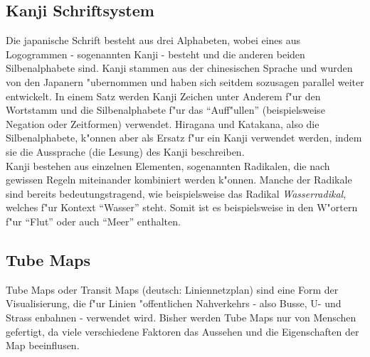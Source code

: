 \subsection{Kanji Schriftsystem}
Die japanische Schrift besteht aus drei Alphabeten, wobei eines aus Logogrammen - sogenannten Kanji - besteht und die anderen beiden Silbenalphabete sind. Kanji stammen aus der chinesischen Sprache und wurden von den Japanern "ubernommen und haben sich seitdem sozusagen parallel weiter entwickelt. In einem Satz werden Kanji Zeichen unter Anderem f"ur den Wortstamm und die Silbenalphabete f"ur das "`Auff"ullen"' (beispielsweise Negation oder Zeitformen) verwendet. Hiragana und Katakana, also die Silbenalphabete, k"onnen aber als Ersatz f"ur ein Kanji verwendet werden, indem sie die Aussprache (die Lesung) des Kanji beschreiben. \\
Kanji bestehen aus einzelnen Elementen, sogenannten Radikalen, die nach gewissen Regeln miteinander kombiniert werden k"onnen. Manche der Radikale sind bereits bedeutungstragend, wie beispielsweise das Radikal \emph{Wasserradikal}, welches f"ur Kontext "`Wasser"' steht. Somit ist es beispielsweise in den W"ortern f"ur "`Flut"' oder auch "`Meer"' enthalten. 

\subsection{Tube Maps}
Tube Maps oder Transit Maps (deutsch: Liniennetzplan) sind eine Form der Visualisierung, die f"ur Linien "offentlichen Nahverkehrs - also Busse, U- und Strass enbahnen - verwendet wird. Bisher werden Tube Maps nur von Menschen gefertigt, da viele verschiedene Faktoren das Aussehen und die Eigenschaften der Map beeinflusen.  
